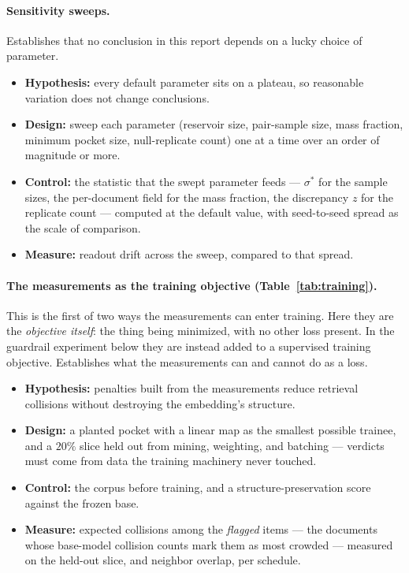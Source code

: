 \documentclass[11pt,letterpaper]{article}
\newcommand{\sstar}{\sigma^{*}}
\begin{document}
\paragraph{Sensitivity sweeps.}
Establishes that no conclusion in this report depends on a lucky choice
of parameter.
\begin{itemize}
  \item \textbf{Hypothesis:} every default parameter sits on a
plateau, so reasonable variation does not change conclusions.
  \item \textbf{Design:} sweep each parameter (reservoir size,
pair-sample size, mass fraction, minimum pocket size, null-replicate
count) one at a time over an order of magnitude or more.
  \item \textbf{Control:} the statistic that the swept parameter feeds
--- $\sstar$ for the sample sizes, the per-document field for the mass
fraction, the discrepancy $z$ for the replicate count --- computed at
the default value, with seed-to-seed spread as the scale of comparison.
  \item \textbf{Measure:} readout drift across the sweep,
compared to that spread.
\end{itemize}


\paragraph{The measurements as the training objective
(Table~\ref{tab:training}).}
This is the first of two ways the measurements can enter training.
Here they are the \emph{objective itself}: the thing being minimized,
with no other loss present. In the guardrail experiment below they are
instead added to a supervised training objective.
Establishes what the measurements can and cannot do as a loss.
\begin{itemize}
  \item \textbf{Hypothesis:} penalties built from the measurements
reduce retrieval collisions without destroying the embedding's
structure.
  \item \textbf{Design:} a planted pocket with a linear map as the
smallest possible trainee, and a $20\%$ slice held out from mining,
weighting, and batching --- verdicts must come from data the training
machinery never touched.
  \item \textbf{Control:} the corpus before training, and a
structure-preservation score against the frozen base.
  \item \textbf{Measure:} expected collisions among the \emph{flagged}
items --- the documents whose base-model collision counts mark them as
most crowded --- measured on the held-out slice, and neighbor overlap,
per schedule.
\end{itemize}

\end{document}
